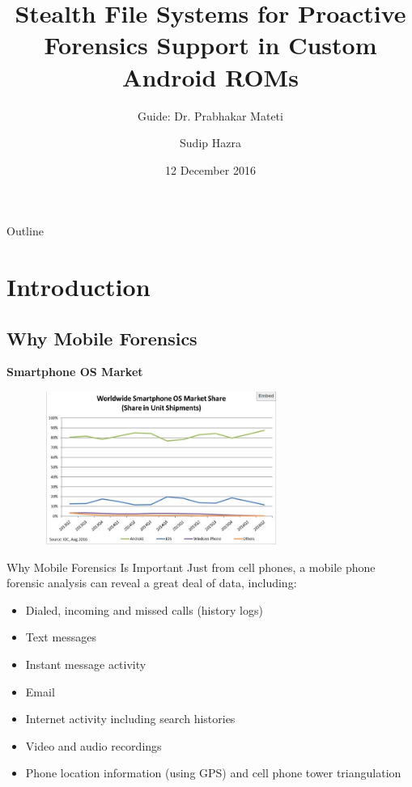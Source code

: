 \documentclass[12pt]{beamer}
\title{Stealth File Systems  for Proactive Forensics Support in Custom Android ROMs}
\author{Guide: Dr. Prabhakar Mateti\inst{1} \and Sudip Hazra\inst{2}}
\institute[Universities of Somewhere and Elsewhere] %
{
  \inst{1}%
  Wright State University
  \and
  \inst{2}%
  Amrita Centre For Cyber Security Systems and Networks\\
 Amrita University}
\date{12 December 2016}
\begin{document}
\begin{frame}
  \titlepage
 
\end{frame}

\begin{frame}{Outline}
  \tableofcontents
 
\end{frame}

\section{Introduction}
\subsection{Why Mobile Forensics}
\centering
\vspace{5cm}
\bf{Smartphone OS Market}
\begin{figure}
\vspace{-1cm}
\includegraphics[width=8cm,height=5cm]{images/idc}
\end{figure}
\begin{frame}{Why Mobile Forensics Is Important}
Just from cell phones, a mobile phone forensic analysis can reveal a great deal of data, including:
\begin{itemize}
\item Dialed, incoming and missed calls (history logs)
\item Text messages
\item Instant message activity
\item Email
\item Internet activity including search histories
\item Video and audio recordings
\item Phone location information (using GPS) and cell phone tower triangulation
\end{itemize}
  
\end{frame}
\end{document}
